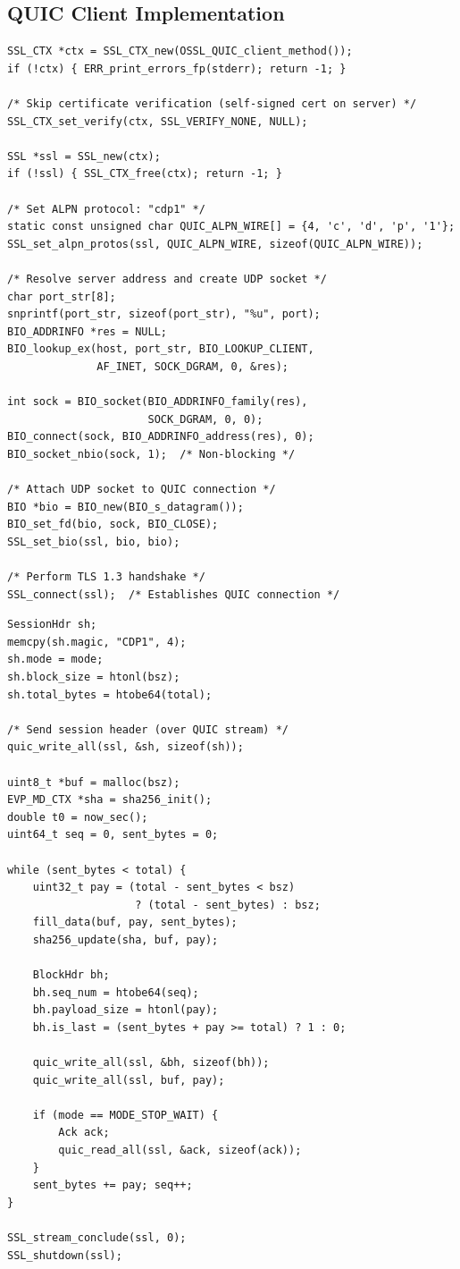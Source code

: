 \documentclass[12pt,a4paper]{article}
\begin{document}
\subsection{QUIC Client Implementation}

\begin{lstlisting}[caption=QUIC Client – Context and Socket Setup,label=lst:quic_client_setup]
SSL_CTX *ctx = SSL_CTX_new(OSSL_QUIC_client_method());
if (!ctx) { ERR_print_errors_fp(stderr); return -1; }

/* Skip certificate verification (self-signed cert on server) */
SSL_CTX_set_verify(ctx, SSL_VERIFY_NONE, NULL);

SSL *ssl = SSL_new(ctx);
if (!ssl) { SSL_CTX_free(ctx); return -1; }

/* Set ALPN protocol: "cdp1" */
static const unsigned char QUIC_ALPN_WIRE[] = {4, 'c', 'd', 'p', '1'};
SSL_set_alpn_protos(ssl, QUIC_ALPN_WIRE, sizeof(QUIC_ALPN_WIRE));

/* Resolve server address and create UDP socket */
char port_str[8];
snprintf(port_str, sizeof(port_str), "%u", port);
BIO_ADDRINFO *res = NULL;
BIO_lookup_ex(host, port_str, BIO_LOOKUP_CLIENT,
              AF_INET, SOCK_DGRAM, 0, &res);

int sock = BIO_socket(BIO_ADDRINFO_family(res), 
                      SOCK_DGRAM, 0, 0);
BIO_connect(sock, BIO_ADDRINFO_address(res), 0);
BIO_socket_nbio(sock, 1);  /* Non-blocking */

/* Attach UDP socket to QUIC connection */
BIO *bio = BIO_new(BIO_s_datagram());
BIO_set_fd(bio, sock, BIO_CLOSE);
SSL_set_bio(ssl, bio, bio);

/* Perform TLS 1.3 handshake */
SSL_connect(ssl);  /* Establishes QUIC connection */
\end{lstlisting}

\begin{lstlisting}[caption=QUIC Client – Data Transfer,label=lst:quic_client_transfer]
SessionHdr sh;
memcpy(sh.magic, "CDP1", 4);
sh.mode = mode;
sh.block_size = htonl(bsz);
sh.total_bytes = htobe64(total);

/* Send session header (over QUIC stream) */
quic_write_all(ssl, &sh, sizeof(sh));

uint8_t *buf = malloc(bsz);
EVP_MD_CTX *sha = sha256_init();
double t0 = now_sec();
uint64_t seq = 0, sent_bytes = 0;

while (sent_bytes < total) {
    uint32_t pay = (total - sent_bytes < bsz) 
                    ? (total - sent_bytes) : bsz;
    fill_data(buf, pay, sent_bytes);
    sha256_update(sha, buf, pay);
    
    BlockHdr bh;
    bh.seq_num = htobe64(seq);
    bh.payload_size = htonl(pay);
    bh.is_last = (sent_bytes + pay >= total) ? 1 : 0;
    
    quic_write_all(ssl, &bh, sizeof(bh));
    quic_write_all(ssl, buf, pay);
    
    if (mode == MODE_STOP_WAIT) {
        Ack ack;
        quic_read_all(ssl, &ack, sizeof(ack));
    }
    sent_bytes += pay; seq++;
}

SSL_stream_conclude(ssl, 0);
SSL_shutdown(ssl);
\end{lstlisting}
\end{document}
